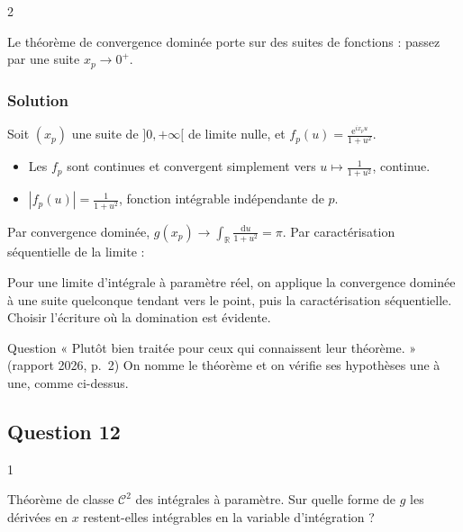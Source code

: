 \documentclass[11pt,a4paper]{article}
\providecommand{\tightlist}{\setlength{\itemsep}{0pt}\setlength{\parskip}{0pt}}
\newcommand{\equationajustee}[1]{%
  \sbox{\boiteequation}{$\displaystyle #1$}%
  \ifdim\wd\boiteequation>\linewidth
    \[\resizebox{\linewidth}{!}{\usebox{\boiteequation}}\]%
  \else
    \[#1\]%
  \fi}
\begin{document}
\begin{indication}{2}

Le théorème de convergence dominée porte sur des suites de fonctions : passez par une suite \(x_p\to0^+\).

\end{indication}

\hypertarget{solution-10}{%
\subsubsection{Solution}\label{solution-10}}

Soit \((x_p)\) une suite de \(]0,+\infty[\) de limite nulle, et \(f_p(u)=\frac{{\mathrm{e}}^{ix_pu}}{1+u^2}\).

\begin{itemize}
\tightlist
\item
  Les \(f_p\) sont continues et convergent simplement vers \(u\mapsto\frac{1}{1+u^2}\), continue.
\item
  \(|f_p(u)|=\frac{1}{1+u^2}\), fonction intégrable indépendante de \(p\).
\end{itemize}

Par convergence dominée, \(g(x_p)\to\int_{\mathbb{R}}\frac{\mathrm{d}u}{1+u^2}=\pi\). Par caractérisation séquentielle de la limite :

\equationajustee{\boxed{\lim_{x\to0^+}g(x)=\pi.}}

\begin{methode}

Pour une limite d'intégrale à paramètre réel, on applique la convergence dominée à une suite quelconque tendant vers le point, puis la caractérisation séquentielle. Choisir l'écriture où la domination est évidente.

\end{methode}

\begin{jury}

Question « Plutôt bien traitée pour ceux qui connaissent leur théorème. » (rapport 2026, p.~2) On nomme le théorème et on vérifie ses hypothèses une à une, comme ci-dessus.

\end{jury}

\hypertarget{question-12}{%
\subsection{Question 12}\label{question-12}}

\begin{indication}{1}

Théorème de classe \({\mathcal{C}}^2\) des intégrales à paramètre. Sur quelle forme de \(g\) les dérivées en \(x\) restent-elles intégrables en la variable d'intégration ?

\end{indication}
\end{document}
